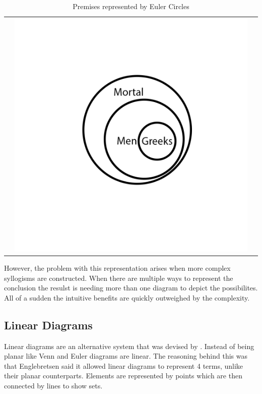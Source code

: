 \documentclass[12pt,a4paper]{report}
\begin{document}
\begin{table}[htb]
\begin{tabular}{ c  c  c }
\begin{minipage}{.29\textwidth}
    \end{minipage}
    & 
    \begin{minipage}{.29\textwidth}
      \includegraphics[scale=0.25]{EulerAllGreeksAreMortal}
    \end{minipage}
    \\
  \end{tabular}
  \caption{Premises represented by Euler Circles}\label{tbl:eulerPremises}
\end{table}
\FloatBarrier
However, the problem with this representation arises when more complex syllogisms are constructed. When there are multiple ways to represent the conclusion the resulst is needing more than one diagram to depict the possibilites. All of a sudden the intuitive benefits are quickly outweighed by the complexity.


\subsection{Linear Diagrams}
Linear diagrams are an alternative system that was devised by \cite{englebretsen1991}. Instead of being planar like Venn and Euler diagrams are linear. The reasoning behind this was that Englebretsen said it allowed linear diagrams to represent 4 terms, unlike their planar counterparts. Elements are represented by points which are then connected by lines to show sets.
\end{document}
